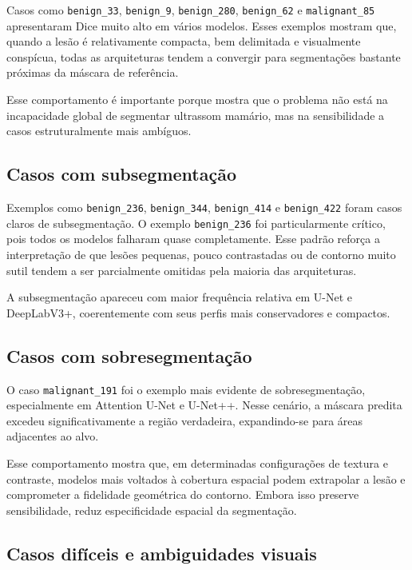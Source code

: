 \documentclass[tcc,capa]{texufpel}
\begin{document}
Casos como \texttt{benign\_33}, \texttt{benign\_9}, \texttt{benign\_280}, \texttt{benign\_62} e \texttt{malignant\_85} apresentaram Dice muito alto em vários modelos. Esses exemplos mostram que, quando a lesão é relativamente compacta, bem delimitada e visualmente conspícua, todas as arquiteturas tendem a convergir para segmentações bastante próximas da máscara de referência.

Esse comportamento é importante porque mostra que o problema não está na incapacidade global de segmentar ultrassom mamário, mas na sensibilidade a casos estruturalmente mais ambíguos.

\subsection{Casos com subsegmentação}

Exemplos como \texttt{benign\_236}, \texttt{benign\_344}, \texttt{benign\_414} e \texttt{benign\_422} foram casos claros de subsegmentação. O exemplo \texttt{benign\_236} foi particularmente crítico, pois todos os modelos falharam quase completamente. Esse padrão reforça a interpretação de que lesões pequenas, pouco contrastadas ou de contorno muito sutil tendem a ser parcialmente omitidas pela maioria das arquiteturas.

A subsegmentação apareceu com maior frequência relativa em U-Net e DeepLabV3+, coerentemente com seus perfis mais conservadores e compactos.

\subsection{Casos com sobresegmentação}

O caso \texttt{malignant\_191} foi o exemplo mais evidente de sobresegmentação, especialmente em Attention U-Net e U-Net++. Nesse cenário, a máscara predita excedeu significativamente a região verdadeira, expandindo-se para áreas adjacentes ao alvo.

Esse comportamento mostra que, em determinadas configurações de textura e contraste, modelos mais voltados à cobertura espacial podem extrapolar a lesão e comprometer a fidelidade geométrica do contorno. Embora isso preserve sensibilidade, reduz especificidade espacial da segmentação.

\subsection{Casos difíceis e ambiguidades visuais}
\end{document}
